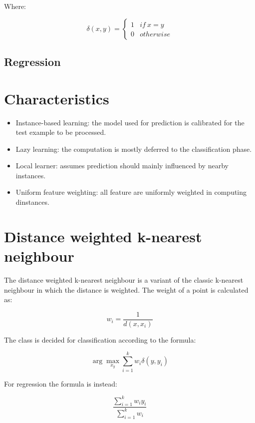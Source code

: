 		

		Where:

		$$\delta(x,y) = \begin{cases}1 &if\ x=y\\0 &otherwise\end{cases}$$

	\subsection{Regression}

		

\section{Characteristics}

	\begin{multicols}{2}
		\begin{itemize}
			\item Instance-based learning: the model used for prediction is calibrated for the test example to be processed.
			\item Lazy learning: the computation is mostly deferred to the classification phase.
			\item Local learner: assumes prediction should mainly influenced by nearby instances.
			\item Uniform feature weighting: all feature are uniformly weighted in computing dinstances.
		\end{itemize}
	\end{multicols}

\section{Distance weighted k-nearest neighbour}
The distance weighted k-nearest neighbour is a variant of the classic k-nearest neighbour in which the distance is weighted.
The weight of a point is calculated as:

$$w_i = \frac{1}{d(x,x_i)}$$

The class is decided for classification according to the formula:

$$\arg\max\limits_{x_y}\sum\limits_{i = 1}^k w_i\delta(y, y_i)$$

For regression the formula is instead:

$$\dfrac{\sum\limits_{i = 1}^kw_iy_i}{\sum\limits_{i=1}^k w_i}$$

